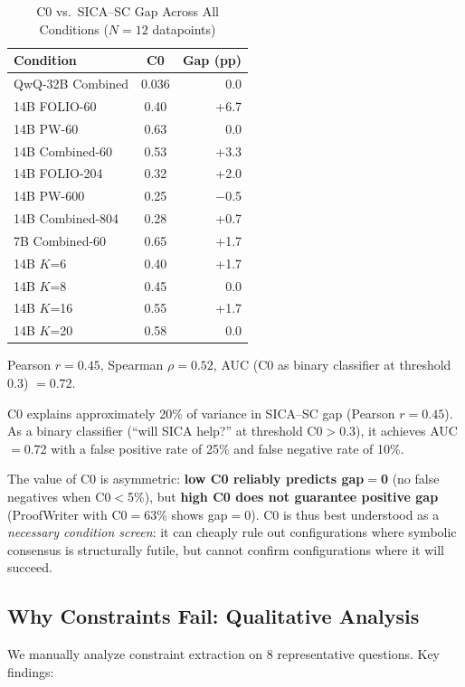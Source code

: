 \documentclass[11pt]{article}
\begin{document}
\begin{table}[h]
\centering
\caption{C0 vs.\ SICA--SC Gap Across All Conditions ($N=12$ datapoints)}
\label{tab:c0_diagnostic}
\begin{tabular}{lcr}
\toprule
Condition & C0 & Gap (pp) \\
\midrule
QwQ-32B Combined & 0.036 & 0.0 \\
14B FOLIO-60 & 0.40 & +6.7 \\
14B PW-60 & 0.63 & 0.0 \\
14B Combined-60 & 0.53 & +3.3 \\
14B FOLIO-204 & 0.32 & +2.0 \\
14B PW-600 & 0.25 & $-$0.5 \\
14B Combined-804 & 0.28 & +0.7 \\
7B Combined-60 & 0.65 & +1.7 \\
14B $K$=6 & 0.40 & +1.7 \\
14B $K$=8 & 0.45 & 0.0 \\
14B $K$=16 & 0.55 & +1.7 \\
14B $K$=20 & 0.58 & 0.0 \\
\bottomrule
\end{tabular}
\vspace{0.5em}

Pearson $r = 0.45$, Spearman $\rho = 0.52$, AUC (C0 as binary classifier at threshold 0.3) $= 0.72$.
\end{table}

C0 explains approximately 20\% of variance in SICA--SC gap (Pearson $r=0.45$). As a binary classifier (``will SICA help?'' at threshold C0$>$0.3), it achieves AUC$=$0.72 with a false positive rate of 25\% and false negative rate of 10\%.

The value of C0 is asymmetric: \textbf{low C0 reliably predicts gap$=$0} (no false negatives when C0$<$5\%), but \textbf{high C0 does not guarantee positive gap} (ProofWriter with C0$=$63\% shows gap$=$0). C0 is thus best understood as a \emph{necessary condition screen}: it can cheaply rule out configurations where symbolic consensus is structurally futile, but cannot confirm configurations where it will succeed.

\subsection{Why Constraints Fail: Qualitative Analysis}

We manually analyze constraint extraction on 8 representative questions. Key findings:
\end{document}
